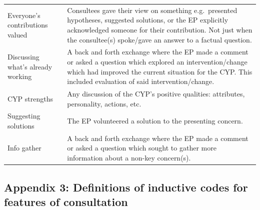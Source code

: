 \documentclass[
  english,
  man,floatsintext]{apa6}
\begin{document}
\begin{longtable}[]{@{}
  >{\raggedright\arraybackslash}p{}
  >{\raggedright\arraybackslash}p{}@{}}
Everyone's contributions
valued & Consultees gave their view on
something e.g.~presented
hypotheses, suggested solutions,
or the EP explicitly acknowledged
someone for their contribution.
Not just when the consultee(s)
spoke/gave an answer to a factual
question. \\
Discussing what's already
working & A back and forth exchange where
the EP made a comment or asked a
question which explored an
intervention/change which had
improved the current situation for
the CYP. This included evaluation
of said intervention/change. \\
CYP strengths & Any discussion of the CYP's
positive qualities: attributes,
personality, actions, etc. \\
Suggesting solutions & The EP volunteered a solution to
the presenting concern. \\
Info gather & A back and forth exchange where
the EP made a comment or asked a
question which sought to gather
more information about a non-key
concern(s). \\
\bottomrule
\end{longtable}

\newpage

\hypertarget{appendix-3-definitions-of-inductive-codes-for-features-of-consultation}{%
\subsection{Appendix 3: Definitions of inductive codes for features of consultation}\label{appendix-3-definitions-of-inductive-codes-for-features-of-consultation}}
\end{document}
